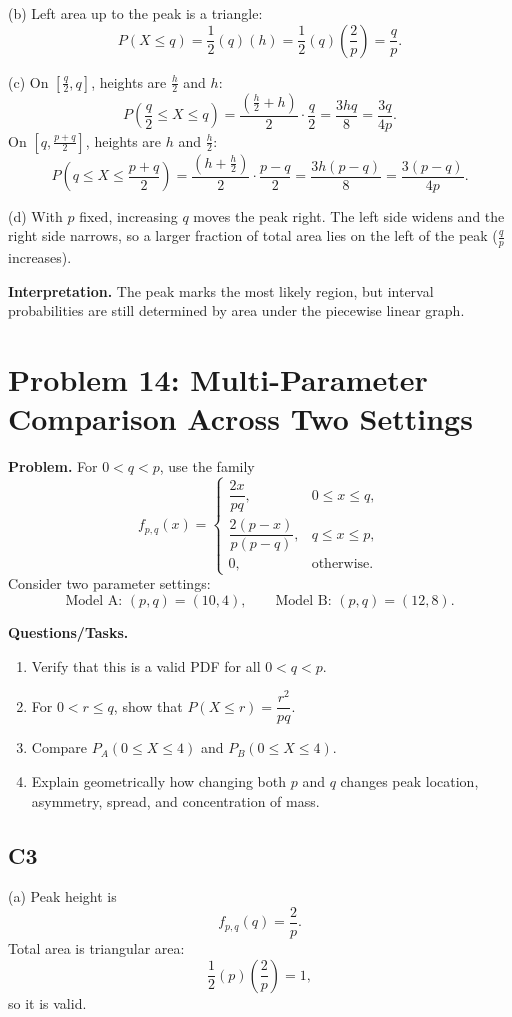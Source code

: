(b) Left area up to the peak is a triangle:
\[
P(X\le q)=\frac12(q)(h)=\frac12(q)\left(\frac{2}{p}\right)=\frac{q}{p}.
\]

(c) On $\left[\frac q2,q\right]$, heights are $\frac h2$ and $h$:
\[
P\!\left(\frac q2\le X\le q\right)=\frac{\left(\frac h2+h\right)}{2}\cdot\frac q2=\frac{3hq}{8}=\frac{3q}{4p}.
\]
On $\left[q,\frac{p+q}{2}\right]$, heights are $h$ and $\frac h2$:
\[
P\!\left(q\le X\le\frac{p+q}{2}\right)=\frac{\left(h+\frac h2\right)}{2}\cdot\frac{p-q}{2}=\frac{3h(p-q)}{8}=\frac{3(p-q)}{4p}.
\]

(d) With $p$ fixed, increasing $q$ moves the peak right. The left side widens and the right side narrows, so a larger fraction of total area lies on the left of the peak ($\frac{q}{p}$ increases).

\textbf{Interpretation.}
The peak marks the most likely region, but interval probabilities are still determined by area under the piecewise linear graph.

\section{Problem 14: Multi-Parameter Comparison Across Two Settings}

\textbf{Problem.}
For $0<q<p$, use the family
\[
f_{p,q}(x)=\begin{cases}
\dfrac{2x}{pq}, & 0\le x\le q,\\
\dfrac{2(p-x)}{p(p-q)}, & q\le x\le p,\\
0, & \text{otherwise.}
\end{cases}
\]
Consider two parameter settings:
\[
\text{Model A: }(p,q)=(10,4),\qquad \text{Model B: }(p,q)=(12,8).
\]

\textbf{Questions/Tasks.}
\begin{enumerate}
\item Verify that this is a valid PDF for all $0<q<p$.
\item For $0<r\le q$, show that $P(X\le r)=\dfrac{r^2}{pq}$.
\item Compare $P_A(0\le X\le 4)$ and $P_B(0\le X\le 4)$.
\item Explain geometrically how changing both $p$ and $q$ changes peak location, asymmetry, spread, and concentration of mass.
\end{enumerate}

\subsection*{C3}
(a) Peak height is
\[
f_{p,q}(q)=\frac{2}{p}.
\]
Total area is triangular area:
\[
\frac12(p)\left(\frac{2}{p}\right)=1,
\]
so it is valid.

